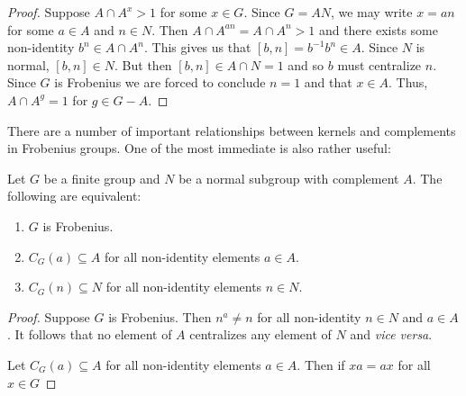 \documentclass[main.tex]{subfiles}
\begin{document}
\begin{proof}
Suppose $A \cap A^x > 1$ for some $x \in G$. Since $G = AN$, we may write $x = an$ for some $a \in A$ and $n \in N$. Then $A \cap A^{an} = A \cap A^n > 1$ and there exists some non-identity $b^n \in A \cap A^n$. This gives us that $[b,n] = b^{-1}b^n \in A$. Since $N$ is normal, $[b, n] \in N$. But then $[b,n] \in A \cap N = 1$ and so $b$ must centralize $n$. Since $G$ is Frobenius we are forced to conclude $n = 1$ and that $x \in A$. Thus, $A \cap A^g = 1$ for $g \in G - A$.
\end{proof}

There are a number of important relationships between kernels and complements in Frobenius groups. One of the most immediate is also rather useful:

\begin{theorem}
Let $G$ be a finite group and $N$ be a normal subgroup with complement $A$. The following are equivalent:
\begin{enumerate}
	\item $G$ is Frobenius.
	\item $C_G(a) \subseteq A$ for all non-identity elements $a \in A$.
	\item $C_G(n) \subseteq N$ for all non-identity elements $n \in N$.
\end{enumerate}
\end{theorem}

\begin{proof}
Suppose $G$ is Frobenius. Then $n^a \ne n$ for all non-identity $n \in N$ and $a \in A$. It follows that no element of $A$ centralizes any element of $N$ and \emph{vice versa}.

Let $C_G(a) \subseteq A$ for all non-identity elements $a \in A$. Then if $xa = ax$ for all $x \in G$
\end{proof}
\end{document}
